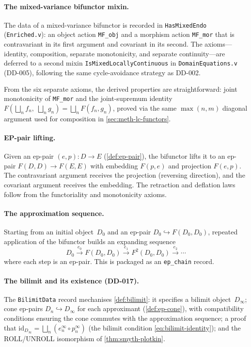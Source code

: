 \paragraph{The mixed-variance bifunctor mixin.}
The data of a mixed-variance bifunctor is recorded in
\texttt{HasMixedEndo} (\texttt{Enriched.v}): an object action
\texttt{MF\_obj} and a morphism action \texttt{MF\_mor} that is
contravariant in its first argument and covariant in its second.
The axioms---identity, composition, separate monotonicity, and
separate continuity---are deferred to a second mixin
\texttt{IsMixedLocallyContinuous} in \texttt{DomainEquations.v}
(DD-005), following the same cycle-avoidance strategy as DD-002.

From the six separate axioms, the derived properties are straightforward:
joint monotonicity of \texttt{MF\_mor}
and the joint-supremum identity
$F(\bigsqcup_n f_n,\; \bigsqcup_n g_n) = \bigsqcup_n F(f_n, g_n)$,
proved via the same $\max(n,m)$ diagonal argument used for composition
in \cref{sec:meth-lc-functors}.

\paragraph{EP-pair lifting.}
Given an ep-pair $(e, p) : D \to E$
(\cref{def:ep-pair}), the bifunctor lifts it to an ep-pair
$F(D,D) \to F(E,E)$ with embedding $F(p, e)$ and projection $F(e, p)$.
The contravariant argument receives the projection (reversing
direction), and the covariant argument receives the embedding.  The
retraction and deflation laws follow from the functoriality
and monotonicity axioms.

\paragraph{The approximation sequence.}
Starting from an initial object~$D_0$ and an ep-pair
$D_0 \hookrightarrow F(D_0, D_0)$, repeated application of the
bifunctor builds an expanding sequence
\[
  D_0 \xrightarrow{e_0} F(D_0, D_0) \xrightarrow{e_1}
    F^2(D_0, D_0) \xrightarrow{e_2} \cdots
\]
where each step is an ep-pair.  This is packaged as an
\texttt{ep\_chain} record.

\paragraph{The bilimit and its existence (DD-017).}
The \texttt{BilimitData} record mechanises \cref{def:bilimit}: it
specifies a bilimit object~$D_\infty$;
cone ep-pairs $D_n \hookrightarrow D_\infty$ for each approximant
(\cref{def:ep-cone}),
with compatibility conditions ensuring the cone commutes with the
approximation sequence; a proof that
$\mathrm{id}_{D_\infty} = \bigsqcup_n (e^\infty_n \circ p^\infty_n)$
(the bilimit condition \eqref{eq:bilimit-identity}); and the
ROLL/UNROLL isomorphism of \cref{thm:smyth-plotkin}.

